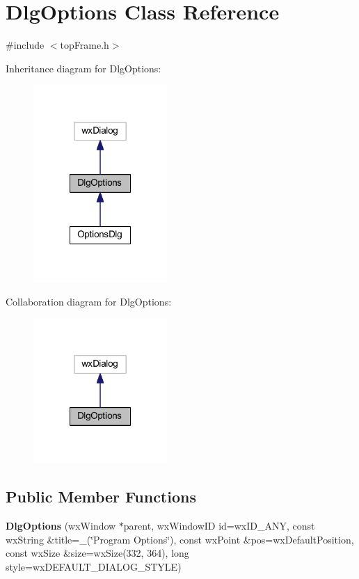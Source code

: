 \hypertarget{class_dlg_options}{\section{Dlg\-Options Class Reference}
\label{class_dlg_options}
}


{\ttfamily \#include $<$top\-Frame.\-h$>$}



Inheritance diagram for Dlg\-Options\-:
\nopagebreak
\begin{figure}[H]
\begin{center}
\leavevmode
\includegraphics[width=144pt]{class_dlg_options__inherit__graph}
\end{center}
\end{figure}


Collaboration diagram for Dlg\-Options\-:
\nopagebreak
\begin{figure}[H]
\begin{center}
\leavevmode
\includegraphics[width=144pt]{class_dlg_options__coll__graph}
\end{center}
\end{figure}
\subsection*{Public Member Functions}
\begin{DoxyCompactItemize}
\item 
\hypertarget{class_dlg_options_adc03c273f743697a2346cec1f3b34efa}{{\bfseries Dlg\-Options} (wx\-Window $\ast$parent, wx\-Window\-I\-D id=wx\-I\-D\-\_\-\-A\-N\-Y, const wx\-String \&title=\-\_\-(\char`\"{}Program Options\char`\"{}), const wx\-Point \&pos=wx\-Default\-Position, const wx\-Size \&size=wx\-Size(332, 364), long style=wx\-D\-E\-F\-A\-U\-L\-T\-\_\-\-D\-I\-A\-L\-O\-G\-\_\-\-S\-T\-Y\-L\-E)}\label{class_dlg_options_adc03c273f743697a2346cec1f3b34efa}

\end{DoxyCompactItemize}
